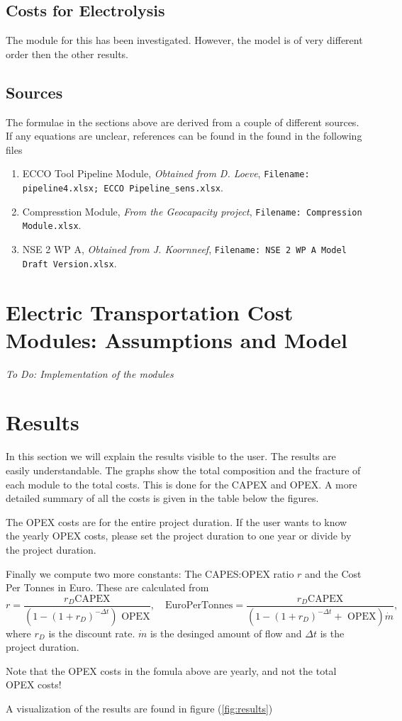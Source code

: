 \documentclass{article}
\begin{document}
\subsection{Costs for Electrolysis}
The module for this has been investigated. However, the model is of very different order then the other results. 

\subsection{Sources}
The formulae in the sections above are derived from a couple of different sources. If any equations are unclear, references can be found in the found in the following files
\begin{enumerate}
\item ECCO Tool Pipeline Module, \textit{Obtained from D. Loeve}, \texttt{Filename: pipeline4.xlsx; ECCO Pipeline\_sens.xlsx}. 
\item Compresstion Module, \textit{From the Geocapacity project}, \texttt{Filename: Compression Module.xlsx}.
\item NSE 2 WP A, \textit{Obtained from J. Koornneef}, \texttt{Filename: NSE 2 WP A Model Draft Version.xlsx}.
\end{enumerate}

\section{Electric Transportation Cost Modules: Assumptions and Model}
\textit{To Do: Implementation of the modules}

\section{Results}
In this section we will explain the results visible to the user. The results are easily understandable. The graphs show the total composition and the fracture of each module to the total costs. This is done for the CAPEX and OPEX. A more detailed summary of all the costs is given in the table below the figures.
\begin{info}
The OPEX costs are for the entire project duration. If the user wants to know the yearly OPEX costs, please set the project duration to one year or divide by the project duration.
\end{info}
Finally we compute two more constants: The CAPES:OPEX ratio $r$ and the Cost Per Tonnes in Euro. These are calculated from
\begin{equation}
r = \frac{r_D\text{CAPEX}}{\left( 1 - \left( 1 + r_D\right)^{-\Delta t}\right)\text{ OPEX}},\quad  \text{EuroPerTonnes} =  \frac{r_D\text{CAPEX}}{\left( 1 - \left( 1 + r_D\right)^{-\Delta t} +\text{ OPEX} \right)\dot{m}},
\end{equation}
where $r_D$ is the discount rate. $\dot{m}$ is the desinged amount of flow and $\Delta t$ is the project duration. 
\begin{info}
Note that the OPEX costs in the fomula above are yearly, and not the total OPEX costs!
\end{info} 
A visualization of the results are found in figure (\ref{fig:results})
\end{document}
